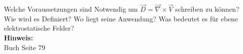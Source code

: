 \begin{question}[section=3,subsection=31,name={Elektrostatisches Vektorpotential},difficulty=3,type=mdl,mode=exm,tags={}]
	Welche Voraussetzungen sind Notwendig um $ \vec D = \vec \nabla \times \vec V $ schreiben zu können? Wie wird es Definiert? Wo liegt seine Anwendung? Was bedeutet es für ebene elektrostatische Felder?
	\\ \textbf{Hinweis:}\\
	Buch Seite 79
\end{question}
\begin{solution}
	
\end{solution}